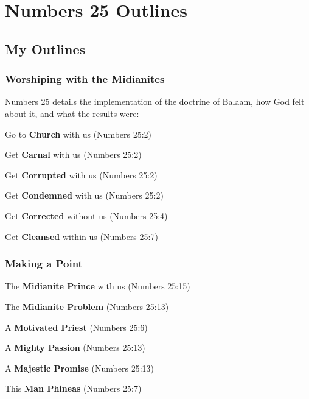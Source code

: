 \section{Numbers 25 Outlines}

\subsection{My Outlines}

\subsubsection{Worshiping with the Midianites}
Numbers 25 details the implementation of the doctrine of Balaam, how God felt about it, and what the results were:
\begin{compactenum}[I.]
    \item Go to \textbf{Church} with us  (Numbers 25:2)
    \item Get \textbf{Carnal} with us  (Numbers 25:2)
    \item Get \textbf{Corrupted} with us  (Numbers 25:2)
    \item Get \textbf{Condemned} with us  (Numbers 25:2)
    \item Get \textbf{Corrected} without us  (Numbers 25:4)
    \item Get \textbf{Cleansed} within us  (Numbers 25:7)
\end{compactenum}

\subsubsection{Making a Point}
\begin{compactenum}[I.][7]
    \item The \textbf{Midianite Prince} with us  (Numbers 25:15)
    \item The \textbf{Midianite Problem}  (Numbers 25:13)
    \item A \textbf{Motivated Priest}  (Numbers 25:6)
    \item A \textbf{Mighty Passion}  (Numbers 25:13)
    \item A \textbf{Majestic Promise}  (Numbers 25:13)
    \item This \textbf{Man Phineas}  (Numbers 25:7)
\end{compactenum}

